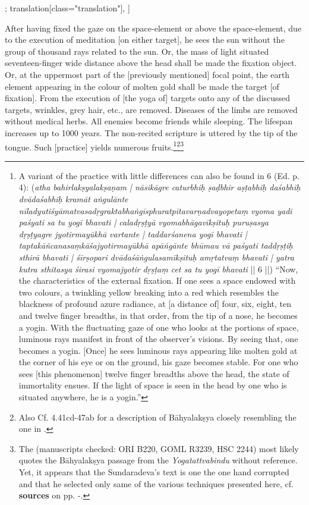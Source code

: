 \begin{alignment}[
  texts=edition[class="edition"];
  translation[class="translation"],
  ]
\begin{translation}
\begin{tlate}[p23_02]
After having fixed the gaze on the space-element or above the space-element, due to the execution of meditation [on either target], he sees the sun without the group of thousand rays related to the sun. Or, the mass of light situated seventeen-finger wide distance above the head shall be made the fixation object. Or, at the uppermost part of the [previously mentioned] focal point, the earth element appearing in the colour of molten gold shall be made the target [of fixation]. From the execution of [the yoga of] targets onto any of the discussed targets, wrinkles, grey hair, etc., are removed. Diseases of the limbs are removed without medical herbs. All enemies become friends while sleeping. The lifespan increases up to 1000 years. The non-recited scripture is uttered by the tip of the tongue. Such [practice] yields numerous fruits.\footnote{A variant of the practice with little differences can also be found in  6 (Ed. p. 4): (\textit{atha bahirlakṣyalakṣaṇam | nāsikāgre caturbhiḥ ṣaḍbhir aṣṭabhiḥ daśabhiḥ dvādaśabhiḥ kramāt aṅgulānte nīladyutiśyāmatvasadṛgraktabhaṅgīsphuratpītavarṇadvayopetaṃ vyoma yadi paśyati sa tu yogī bhavati | caladṛṣṭyā vyomabhāgavīkṣituḥ puruṣasya dṛṣṭyagre jyotirmayūkhā vartante | taddarśanena yogī bhavati | taptakāñcanasaṃkāśajyotirmayūkhā apāṅgānte bhūmau vā paśyati taddṛṣṭiḥ sthirā bhavati | śīrṣopari dvādaśāṅgulasamīkṣituḥ amṛtatvaṃ bhavati | yatra kutra sthitasya śirasi vyomajyotir dṛṣṭaṃ cet sa tu yogī bhavati} || 6 ||) ``Now, the characteristics of the external fixation. If one sees a space endowed with two colours, a twinkling yellow breaking into a red which resembles the blackness of profound azure radiance, at [a distance of] four, six, eight, ten and twelve finger breadths, in that order, from the tip of a nose, he becomes a yogin. With the fluctuating gaze of one who looks at the portions of space, luminous rays manifest in front of the observer's visions. By seeing that, one becomes a yogin. [Once] he sees luminous rays appearing like molten gold at the corner of his eye or on the ground, his gaze becomes stable. For one who sees [this phenomenon] twelve finger breadths above the head, the state of immortality ensues. If the light of space is seen in the head by one who is situated anywhere, he is a yogin.''}\footnote{Also Cf.  4.41cd-47ab for a description of Bāhyalakṣya closely resembling the one in .}\footnote{The  (manuscripts checked: ORI B220, GOML R3239, HSC 2244) most likely quotes the Bāhyalakṣya passage from the \textit{Yogatattvabindu} without reference. Yet, it appears that the Sundaradeva's text is one the one hand corrupted and that he selected only same of the various techniques presented here, cf. \textbf{sources} on pp. \pageref{bahya}-\pageref{continuebahya}.}
\end{tlate}
  \end{translation}
\end{alignment}
\pagebreak %
